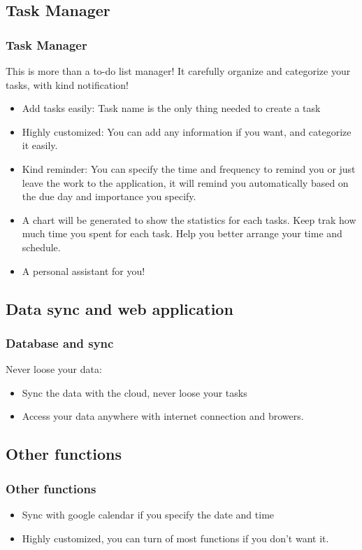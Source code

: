 \documentclass{beamer}
\begin{document}
\subsection{Task Manager}
\begin{frame}\frametitle{Task Manager}
This is more than a to-do list manager! It carefully organize and categorize
your tasks, with kind notification!
\begin{itemize}
\item Add tasks easily: Task name is the only thing needed to create a task
\item Highly customized: You can add any information if you want, and
categorize it easily.
\item Kind reminder: You can specify the time and frequency to remind you or
just leave the work to the application, it will remind you
automatically based on the due day and importance you specify.
\item A chart will be generated to show the statistics for each tasks. Keep
trak how much time you spent for each task. Help you better arrange your time
and schedule. 
\item A personal assistant for you!
\end{itemize}
\end{frame}

\subsection{Data sync and web application}
\begin{frame}\frametitle{Database and sync}
Never loose your data:
\begin{itemize}
\item Sync the data with the cloud, never loose your tasks
\item Access your data anywhere with internet connection and browers.
\end{itemize}
\end{frame}


\subsection{Other functions}
\begin{frame}\frametitle{Other functions}
\begin{itemize}
\item Sync with google calendar if you specify the date and time
\item Highly customized, you can turn of most functions if you don't want it.
\end{itemize}
\end{frame}
\end{document}
